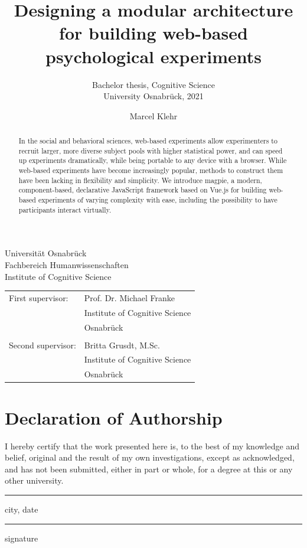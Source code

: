 \documentclass[a4paper,11pt]{scrreprt}
\title{Designing a modular architecture for building web-based psychological experiments}
\subtitle{
Bachelor thesis, Cognitive Science \\
University Osnabrück, 2021}
\author{Marcel Klehr}
\newcommand{\namesigdate}[1][5cm]{%
	\vspace{5cm}
	{\setlength{\parindent}{0cm}
	\begin{minipage}{0.3\textwidth}
		\hrule 
		\vspace{0.5cm}
		{\small city, date}
	\end{minipage}
	 \hfill
	\begin{minipage}{0.3\textwidth}
		\hrule
		\vspace{0.5cm}
	    {\small signature}
	\end{minipage}
	}
}
\begin{document}
\begin{titlepage}
	\begin{flushleft}
		Universität Osnabrück\\
		Fachbereich Humanwissenschaften\\
		Institute of Cognitive Science
	\end{flushleft}

	\vspace{2cm}
	\vspace{1cm}

	\begin{tabular}{ll}
		First supervisor:  & Prof. Dr. Michael Franke\\
		                   & Institute of Cognitive Science                   \\
		                   & Osnabrück                       \\\\
		Second supervisor: & Britta Grusdt, M.Sc.         \\
		                   & Institute of Cognitive Science \\
		                   & Osnabrück
	\end{tabular}

\end{titlepage}

\chapter*{Declaration of Authorship}
I hereby certify that the work presented here is, to the best of my knowledge and belief, original and the result of my own investigations, except as acknowledged, and has not been submitted, either in part or whole, for a degree at this or any other university.

\namesigdate
\pagebreak


\begin{abstract}
In the social and behavioral sciences, web-based experiments allow experimenters to recruit larger, more diverse subject pools with higher statistical power, and can speed up experiments dramatically, while being portable to any device with a browser. While web-based experiments have become increasingly popular, methods to construct them have been lacking in flexibility and simplicity. We introduce magpie, a modern, component-based, declarative JavaScript framework based on Vue.js for building web-based experiments of varying complexity with ease, including the possibility to have participants interact virtually.
\end{abstract}
\newpage 
\end{document}
